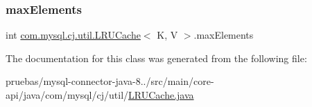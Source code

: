\subsubsection{\texorpdfstring{max\+Elements}{maxElements}}
{\footnotesize\ttfamily int \mbox{\hyperlink{classcom_1_1mysql_1_1cj_1_1util_1_1_l_r_u_cache}{com.\+mysql.\+cj.\+util.\+L\+R\+U\+Cache}}$<$ K, V $>$.max\+Elements\hspace{0.3cm}{\ttfamily [protected]}}



The documentation for this class was generated from the following file\+:\begin{DoxyCompactItemize}
\item 
pruebas/mysql-\/connector-\/java-\/8../src/main/core-\/api/java/com/mysql/cj/util/\mbox{\hyperlink{_l_r_u_cache_8java}{L\+R\+U\+Cache.\+java}}\end{DoxyCompactItemize}
